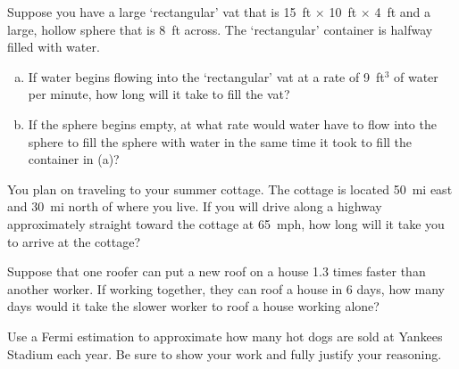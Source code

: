 \documentclass[11pt,letterpaper]{article}
\begin{document}

 Suppose you have a large `rectangular' vat that is 15~ft $\times$ 10~ft $\times$ 4~ft and a large, hollow sphere that is 8~ft across. The `rectangular' container is halfway filled with water. 
	\begin{enumerate}[(a)]
	\item If water begins flowing into the `rectangular' vat at a rate of 9~ft$^3$ of water per minute, how long will it take to fill the vat?
	\item If the sphere begins empty, at what rate would water have to flow into the sphere to fill the sphere with water in the same time it took to fill the container in (a)?
	\end{enumerate}



\newpage



 You plan on traveling to your summer cottage. The cottage is located 50~mi east and 30~mi north of where you live. If you will drive along a highway approximately straight toward the cottage at 65~mph, how long will it take you to arrive at the cottage?



\newpage



 Suppose that one roofer can put a new roof on a house 1.3 times faster than another worker. If working together, they can roof a house in 6 days, how many days would it take the slower worker to roof a house working alone?



\newpage



 Use a Fermi estimation to approximate how many hot dogs are sold at Yankees Stadium each year. Be sure to show your work and fully justify your reasoning. 
\end{document}
